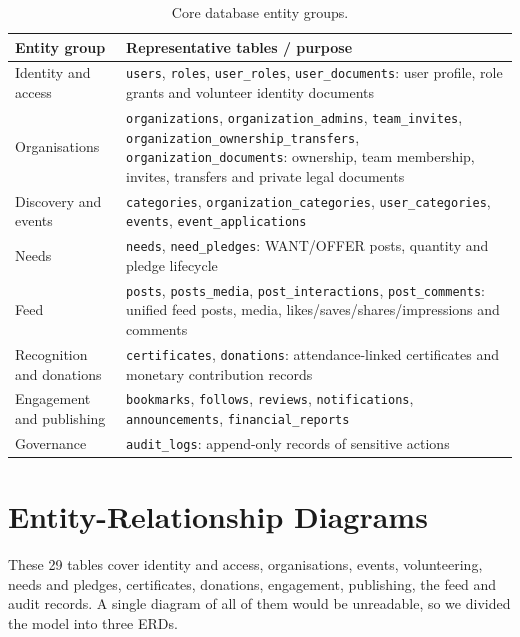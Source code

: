 \begin{table}[H]\centering
\caption{Core database entity groups.}
\label{tab:entities}
\begin{tabularx}{\textwidth}{|p{}|X|}
\hline
\textbf{Entity group} & \textbf{Representative tables / purpose}\\\hline
Identity and access & \texttt{users}, \texttt{roles}, \texttt{user\_roles}, \texttt{user\_documents}: user profile, role grants and volunteer identity documents\\\hline
Organisations & \texttt{organizations}, \texttt{organization\_admins}, \texttt{team\_invites}, \texttt{organization\_ownership\_transfers}, \texttt{organization\_documents}: ownership, team membership, invites, transfers and private legal documents\\\hline
Discovery and events & \texttt{categories}, \texttt{organization\_categories}, \texttt{user\_categories}, \texttt{events}, \texttt{event\_applications}\\\hline
Needs & \texttt{needs}, \texttt{need\_pledges}: WANT/OFFER posts, quantity and pledge lifecycle\\\hline
Feed & \texttt{posts}, \texttt{posts\_media}, \texttt{post\_interactions}, \texttt{post\_comments}: unified feed posts, media, likes/saves/shares/impressions and comments\\\hline
Recognition and donations & \texttt{certificates}, \texttt{donations}: attendance-linked certificates and monetary contribution records\\\hline
Engagement and publishing & \texttt{bookmarks}, \texttt{follows}, \texttt{reviews}, \texttt{notifications}, \texttt{announcements}, \texttt{financial\_reports}\\\hline
Governance & \texttt{audit\_logs}: append-only records of sensitive actions\\\hline
\end{tabularx}
\end{table}

\section{Entity-Relationship Diagrams}
\label{sec:erd}

These 29 tables cover identity and access, organisations, events, volunteering, needs and pledges, certificates, donations, engagement, publishing, the feed and audit records. A single diagram of all of them would be unreadable, so we divided the model into three ERDs.

